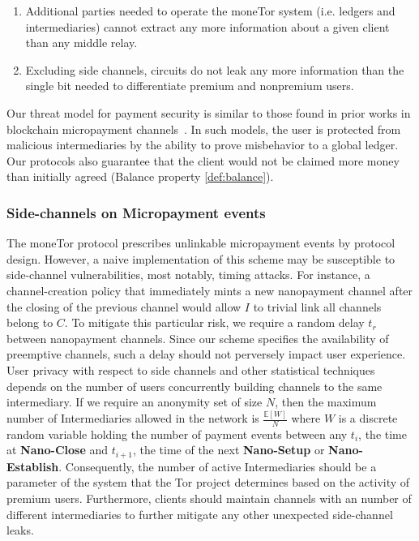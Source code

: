 \begin{enumerate}
\item Additional parties needed to operate the moneTor system (i.e. ledgers and
  intermediaries) cannot extract any more information about a given client than
  any middle relay.
\item Excluding side channels, circuits do not leak any more information than
  the single bit needed to differentiate premium and nonpremium users.
\end{enumerate}

Our threat model for payment security is similar to those found in prior works
in blockchain micropayment channels~\cite{poon2016bitcoin}. In such models, the
user is protected from malicious intermediaries by the ability to prove
misbehavior to a global ledger. Our protocols also guarantee that the client
would not be claimed more money than initially agreed (Balance property
\ref{def:balance}).

\subsubsection{Side-channels on Micropayment events}

The moneTor protocol prescribes unlinkable micropayment events by protocol
design. However, a naive implementation of this scheme may be susceptible to
side-channel vulnerabilities, most notably, timing attacks. For instance, a
channel-creation policy that immediately mints a new nanopayment channel after
the closing of the previous channel would allow $I$ to trivial link all channels
belong to $C$. To mitigate this particular risk, we require a random delay $t_r$
between nanopayment channels. Since our scheme specifies the availability of
preemptive channels, such a delay should not perversely impact user experience.
User privacy with respect to side channels and other statistical techniques
depends on the number of users concurrently building channels to the same
intermediary. If we require an anonymity set of size $N$, then the maximum
number of Intermediaries allowed in the network is $\frac{\mathbb{E}[W]}{N}$
where $W$ is a discrete random variable holding the number of payment events
between any $t_i$, the time at \textbf{Nano-Close} and $t_{i+1}$, the time of the
next \textbf{Nano-Setup} or \textbf{Nano-Establish}. Consequently, the number of
active Intermediaries should be a parameter of the system that the Tor project
determines based on the activity of premium users. Furthermore, clients should
maintain channels with an number of different intermediaries to further mitigate
any other unexpected side-channel leaks.

